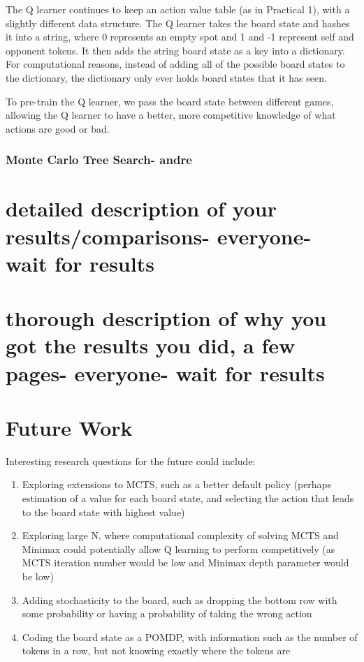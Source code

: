 \documentclass[12pt]{article}
\begin{document}
The Q learner continues to keep an action value table (as in Practical 1), with a slightly different data structure. The Q learner takes the board state and hashes it into a string, where 0 represents an empty spot and 1 and -1 represent self and opponent tokens. It then adds the string board state as a key into a dictionary. For computational reasons, instead of adding all of the possible board states to the dictionary, the dictionary only ever holds board states that it has seen. 

To pre-train the Q learner, we pass the board state between different games, allowing the Q learner to have a better, more competitive knowledge of what actions are good or bad.

\subsubsection{Monte Carlo Tree Search- andre} 


\section{detailed description of your results/comparisons- everyone- wait for results}

\section{thorough description of why you got the results you did, a few pages- everyone- wait for results}


\section{Future Work}

Interesting research questions for the future could include:

\begin{enumerate}
\item Exploring extensions to MCTS, such as a better default policy (perhaps estimation of a value for each board state, and selecting the action that leads to the board state with highest value)
\item Exploring large N, where computational complexity of solving MCTS and Minimax could potentially allow Q learning to perform competitively (as MCTS iteration number would be low and Minimax depth parameter would be low)
\item Adding stochasticity to the board, such as dropping the bottom row with some probability or having a probability of taking the wrong action
\item Coding the board state as a POMDP, with information such as the number of tokens in a row, but not knowing exactly where the tokens are 
\end{enumerate}
\end{document}
